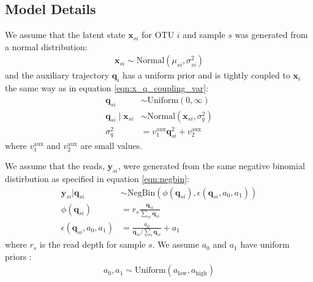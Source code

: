 \documentclass{article}
\newcommand{\var}{\sigma^2}
\newcommand{\Normaldist}{\text{Normal}}
\newcommand{\NegBindist}{\text{NegBin}}
\newcommand{\Uniformdist}{\text{Uniform}}
\newcommand{\qq}{\mathbf{q}}
\newcommand{\xx}{\mathbf{x}}
\newcommand{\yy}{\mathbf{y}}
\newcommand{\varcoupling}{\var_q}
\begin{document}
\begin{appendices}
  \subsection{Model Details}
  We assume that the latent state $\xx_{si}$ for OTU $i$ and sample $s$ was generated from a normal distribution:
  \begin{align}
    \xx_{si} \sim \Normaldist(\mu_{si}, \sigma^2_{si})
  \end{align}
  and the auxiliary trajectory $\qq_i$ has a uniform prior and is tightly coupled to $\xx_i$ the same way as in equation \ref{eqn:x_q_coupling_var}:
  \begin{align}
    \qq_{si} & \sim \Uniformdist (0, \infty) \\
    \qq_{si} \mid \xx_{si} & \sim \Normaldist (\xx_{si}, \varcoupling) \\
    \varcoupling & = v_1^{\text{aux}}\qq_{si}^2 + v_2^{\text{aux}}
  \end{align}
  where $v_1^{\text{aux}}$ and $v_2^{\text{aux}}$ are small values.

  We assume that the reads, $\yy_{si}$, were generated from the same negative binomial distirbution as specified in equation \ref{eqn:negbin}:
  \begin{align}
    \yy_{si} | \qq_{si} & \sim \NegBindist(\phi(\qq_{si}), \epsilon(\qq_{si}, a_0, a_1)) \\
    \phi(\qq_{si}) & = r_s \frac{\qq_{si}}{\sum_{si} \qq_{si}} \\
    \epsilon(\qq_{si}, a_0, a_1) & = \frac{a_0}{\qq_{si}/\sum_i \qq_{si}} + a_1
  \end{align}
  where $r_s$ is the read depth for sample $s$. We assume $a_0$ and $a_1$ have uniform priors \cite{cite:MDSINE}:
  \begin{align}
    a_0, a_1 \sim \Uniformdist(a_{\text{low}},a_{\text{high}})
  \end{align}


\end{appendices}
\end{document}

